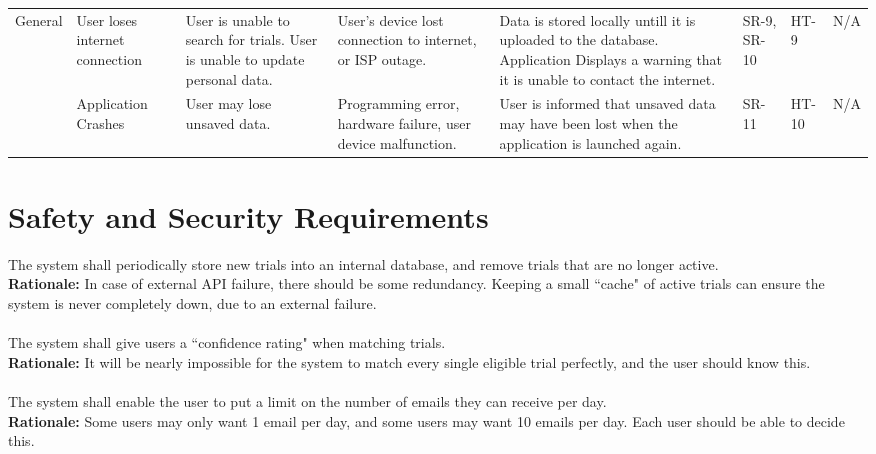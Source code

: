 \documentclass{article}
\begin{document}
\begin{table}[H]
{\begin{tabular}{|p{3cm}|p{3cm}p{3cm}p{3cm}p{3cm}p{3cm}p{2cm}p{2cm}|}
      \hline
      General                                  & User loses internet connection                                                & User is unable to search for trials. User is unable to update personal data.                                          & User's device lost connection to internet, or ISP outage.                                        & Data is stored locally untill it is uploaded to the database. Application Displays a warning that it is unable to contact the internet.                        & SR-9, SR-10       & HT-9   & N/A   \\\cline{2-8}
                                               & Application Crashes                                                           & User may lose unsaved data.                                                                                           & Programming error, hardware failure, user device malfunction.                                    & User is informed that unsaved data may have been lost when the application is launched again.                                                                  & SR-11             & HT-10  & N/A   \\
      \hline
    \end{tabular}}
\end{table}


\section{Safety and Security Requirements}

The system shall periodically store new trials into an internal database, and remove trials that are no longer active.\\
\textbf{Rationale:}
In case of external API failure, there should be some redundancy. Keeping a small ``cache" of active trials can ensure the system is never
completely down, due to an external failure.\\~\\

The system shall give users a ``confidence rating" when matching trials.\\
\textbf{Rationale:}
It will be nearly impossible for the system to match every single eligible trial perfectly, and the user should know this.\\~\\

The system shall enable the user to put a limit on the number of emails they can receive per day.\\
\textbf{Rationale:}
Some users may only want 1 email per day, and some users may want 10 emails per day. Each user should be able to decide this.\\~\\
\end{document}
